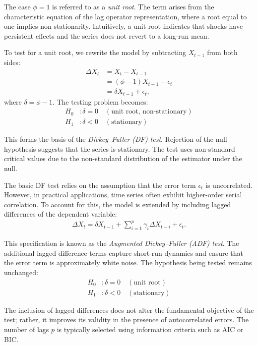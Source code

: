 \documentclass[10pt,a4paper]{article}
\begin{document}
	The case $\phi = 1$ is referred to as a \textit{unit root}. The term arises from the characteristic equation of the lag operator representation, where a root equal to one implies non-stationarity. Intuitively, a unit root indicates that shocks have persistent effects and the series does not revert to a long-run mean.
	
	To test for a unit root, we rewrite the model by subtracting $X_{t-1}$ from both sides:
	\begin{align*}
	\Delta X_t &= X_t - X_{t-1} \\
	&= (\phi - 1) X_{t-1} + \epsilon_t \\
	&= \delta X_{t-1} + \epsilon_t,
	\end{align*} 
	where $\delta = \phi - 1$. The testing problem becomes:
	\begin{align*}
	H_0 &: \delta = 0 \quad (\text{unit root, non-stationary}) \\
	H_1 &: \delta < 0 \quad (\text{stationary})
	\end{align*}
	
	This forms the basis of the \textit{Dickey--Fuller (DF) test}. Rejection of the null hypothesis suggests that the series is stationary. The test uses non-standard critical values due to the non-standard distribution of the estimator under the null.
	
	The basic DF test relies on the assumption that the error term $\epsilon_t$ is uncorrelated. However, in practical applications, time series often exhibit higher-order serial correlation. To account for this, the model is extended by including lagged differences of the dependent variable:
	\begin{align*}
	\Delta X_t = \delta X_{t-1} + \sum_{i=1}^{p} \gamma_i \Delta X_{t-i} + \epsilon_t.
	\end{align*}
	
	This specification is known as the \textit{Augmented Dickey--Fuller (ADF) test}. The additional lagged difference terms capture short-run dynamics and ensure that the error term is approximately white noise. The hypothesis being tested remains unchanged:
	\begin{align*}
	H_0 &: \delta = 0 \quad (\text{unit root}) \\
	H_1 &: \delta < 0 \quad (\text{stationary})
	\end{align*}
	
	The inclusion of lagged differences does not alter the fundamental objective of the test; rather, it improves its validity in the presence of autocorrelated errors. The number of lags $p$ is typically selected using information criteria such as AIC or BIC.
	
\end{document}
